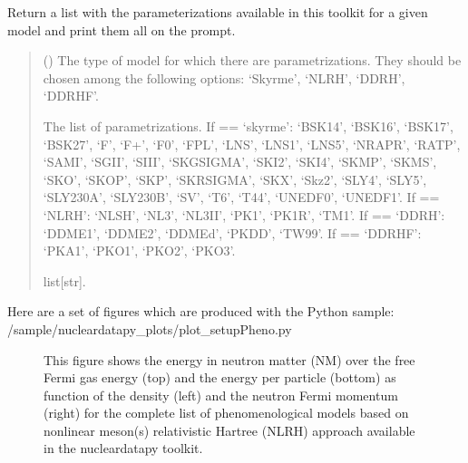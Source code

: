 \documentclass[letterpaper,10pt,english]{sphinxmanual}
\begin{document}
\begin{fulllineitems}
\label{\detokenize{source/api/setup_pheno:nucleardatapy.setup_pheno.params_pheno}}
\pysigstartsignatures
{}
\pysigstopsignatures
\sphinxAtStartPar
Return a list with the parameterizations available in
this toolkit for a given model and print them all on the prompt.
\begin{quote}\begin{description}
\sphinxAtStartPar
{} () \textendash{} The type of model for which there are parametrizations.     They should be chosen among the following options: ‘Skyrme’, ‘NLRH’,     ‘DDRH’, ‘DDRHF’.

\sphinxAtStartPar
The list of parametrizations.     If  == ‘skyrme’: ‘BSK14’,     ‘BSK16’, ‘BSK17’, ‘BSK27’, ‘F\sphinxhyphen{}’, ‘F+’, ‘F0’, ‘FPL’, ‘LNS’, ‘LNS1’, ‘LNS5’,     ‘NRAPR’, ‘RATP’, ‘SAMI’, ‘SGII’, ‘SIII’, ‘SKGSIGMA’, ‘SKI2’, ‘SKI4’, ‘SKMP’,     ‘SKMS’, ‘SKO’, ‘SKOP’, ‘SKP’, ‘SKRSIGMA’, ‘SKX’, ‘Skz2’, ‘SLY4’, ‘SLY5’,     ‘SLY230A’, ‘SLY230B’, ‘SV’, ‘T6’, ‘T44’, ‘UNEDF0’, ‘UNEDF1’.     If  == ‘NLRH’: ‘NL\sphinxhyphen{}SH’, ‘NL3’, ‘NL3II’, ‘PK1’, ‘PK1R’, ‘TM1’.     If  == ‘DDRH’: ‘DDME1’, ‘DDME2’, ‘DDMEd’, ‘PKDD’, ‘TW99’.     If  == ‘DDRHF’: ‘PKA1’, ‘PKO1’, ‘PKO2’, ‘PKO3’.

\sphinxAtStartPar
list{[}str{]}.

\end{description}\end{quote}

\end{fulllineitems}


\sphinxAtStartPar
Here are a set of figures which are produced with the Python sample: /sample/nucleardatapy\_plots/plot\_setupPheno.py

\begin{figure}[htbp]
\centering
\capstart

\noindent{}
\caption{This figure shows the energy in neutron matter (NM) over the free Fermi gas energy (top) and the energy per particle (bottom) as function of the density (left) and the neutron Fermi momentum (right) for the complete list of phenomenological models based on non\sphinxhyphen{}linear meson(s) relativistic Hartree (NLRH) approach available in the nucleardatapy toolkit.}\label{\detokenize{source/api/setup_pheno:id1}}\end{figure}
\end{document}
